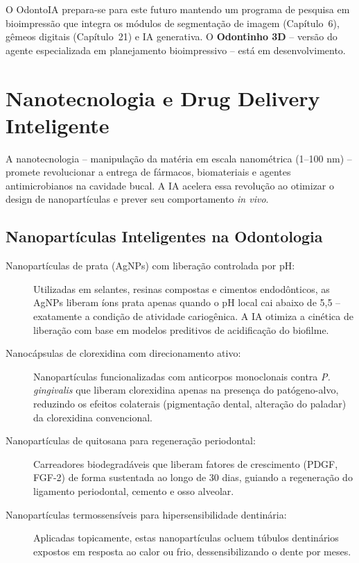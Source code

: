 O OdontoIA prepara-se para este futuro mantendo um programa de pesquisa em
bioimpressão que integra os módulos de segmentação de imagem (Capítulo~6),
gêmeos digitais (Capítulo~21) e IA generativa. O \textbf{Odontinho 3D} --
versão do agente especializada em planejamento bioimpressivo -- está em
desenvolvimento.


\section{Nanotecnologia e Drug Delivery Inteligente}
\label{sec:nanotecnologia}

\nivelcinco

A nanotecnologia -- manipulação da matéria em escala nanométrica (1--100 nm) --
promete revolucionar a entrega de fármacos, biomateriais e agentes
antimicrobianos na cavidade bucal. A IA acelera essa revolução ao otimizar o
design de nanopartículas e prever seu comportamento \textit{in vivo}.


\subsection{Nanopartículas Inteligentes na Odontologia}

\begin{description}
  \item[Nanopartículas de prata (AgNPs) com liberação controlada por pH:]
    Utilizadas em selantes, resinas compostas e cimentos endodônticos, as AgNPs
    liberam íons prata apenas quando o pH local cai abaixo de 5,5 -- exatamente
    a condição de atividade cariogênica. A IA otimiza a cinética de liberação
    com base em modelos preditivos de acidificação do biofilme.

  \item[Nanocápsulas de clorexidina com direcionamento ativo:] Nanopartículas
    funcionalizadas com anticorpos monoclonais contra \textit{P. gingivalis}
    que liberam clorexidina apenas na presença do patógeno-alvo, reduzindo os
    efeitos colaterais (pigmentação dental, alteração do paladar) da
    clorexidina convencional.

  \item[Nanopartículas de quitosana para regeneração periodontal:] Carreadores
    biodegradáveis que liberam fatores de crescimento (PDGF, FGF-2) de forma
    sustentada ao longo de 30 dias, guiando a regeneração do ligamento
    periodontal, cemento e osso alveolar.

  \item[Nanopartículas termossensíveis para hipersensibilidade dentinária:]
    Aplicadas topicamente, estas nanopartículas ocluem túbulos dentinários
    expostos em resposta ao calor ou frio, dessensibilizando o dente por meses.
\end{description}

